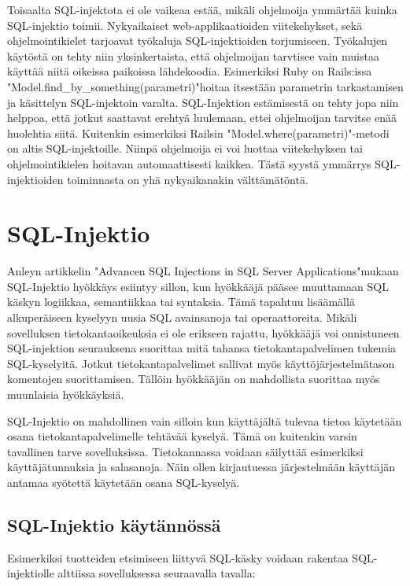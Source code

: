 \documentclass[finnish]{tktltiki2}
\theoremstyle{definition}
\theoremstyle{remark}
\begin{document}
	Toisaalta SQL-injektota ei ole vaikeaa estää, mikäli ohjelmoija ymmärtää kuinka SQL-injektio toimii. Nykyaikaiset web-applikaatioiden viitekehykset, sekä ohjelmointikielet tarjoavat työkaluja SQL-injektioiden torjumiseen. Työkalujen käytöstä on tehty niin yksinkertaista, että ohjelmoijan tarvtisee vain muistaa käyttää niitä oikeissa paikoissa lähdekoodia. Esimerkiksi Ruby on Rails:issa  "Model.find\_by\_something(parametri)"\space hoitaa itsestään parametrin tarkastamisen ja käsittelyn SQL-injektoin varalta. SQL-Injektion estämisestä on tehty jopa niin helppoa, että jotkut saattavat erehtyä luulemaan, ettei ohjelmoijan tarvitse enää huolehtia siitä. Kuitenkin esimerkiksi Railsin "Model.where(parametri)"\space -metodi on altis SQL-injektoille. Niinpä ohjelmoija ei voi luottaa viitekehyksen tai ohjelmointikielen hoitavan automaattisesti kaikkea. Tästä syystä ymmärrys SQL-injektioiden toiminnasta on yhä nykyaikanakin välttämätöntä.  
	
	
	\section{SQL-Injektio}
	Anleyn artikkelin "Advancen SQL Injections in SQL Server Applications"\cite{definition}\space mukaan SQL-Injektio hyökkäys esiintyy sillon, kun hyökkääjä pääsee muuttamaan SQL käskyn logiikkaa, semantiikkaa tai syntaksia. Tämä tapahtuu lisäämällä alkuperäiseen kyselyyn uusia SQL avainsanoja tai operaattoreita.
	Mikäli sovelluksen tietokantaoikeuksia ei ole erikseen rajattu, hyökkääjä voi onnistuneen SQL-injektion seurauksena suorittaa mitä tahansa tietokantapalvelimen tukemia SQL-kyselyitä. Jotkut tietokantapalvelimet sallivat myös käyttöjärjestelmätason komentojen suorittamisen. Tällöin hyökkääjän on mahdollista suorittaa myös muunlaisia hyökkäyksiä. 
	
	SQL-Injektio on mahdollinen vain silloin kun käyttäjältä tulevaa tietoa käytetään osana tietokantapalvelimelle tehtävää kyselyä. Tämä on kuitenkin varsin tavallinen tarve sovelluksissa. Tietokannassa voidaan säilyttää esimerkiksi käyttäjätunnuksia ja salasanoja. Näin ollen kirjautuessa järjestelmään käyttäjän antamaa syötettä käytetään osana SQL-kyselyä.
	
	\subsection{SQL-Injektio käytännössä}
	
 Esimerkiksi tuotteiden etsimiseen liittyvä SQL-käsky voidaan rakentaa SQL-injektiolle alttiissa sovelluksessa seuraavalla tavalla:
 
\end{document}
